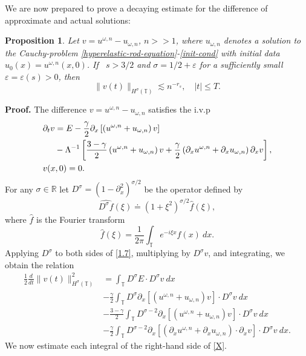 \documentclass[12pt,reqno]{amsart}
\newcommand{\rr}{\mathbb{R}}
\newcommand{\p}{\partial}
\newcommand{\ci}{\mathbb{T}}
\newcommand{\ee}{\varepsilon}
\theoremstyle{plain}  %
\newtheorem{proposition}{Proposition}
\theoremstyle{definition}
\begin{document}
%
%
%
%
%
%
%
%
%
%
We are now prepared to prove a decaying estimate for the difference of 
approximate and actual solutions:
%
%
\begin{proposition}
\label{prop:bound_for_difference-of-approx-actual-soln}
Let $v=u^{\omega,n} - u_{\omega,n}$, $n >>1$,
where $u_{\omega,n}$ denotes a solution to
the Cauchy-problem \eqref{hyperelastic-rod-equation}-\eqref{init-cond} with
initial data $u_0(x) = u^{\omega,n}(x,0)$.
If \ $s > 3/2 $ and $\sigma = 1/2 + \ee$ for a sufficiently
small $\ee = \ee(s) > 0$, then 
%
%
\begin{equation} \label{differ-Hsigma-est} \|
v(t)
\|_{H^\sigma(\ci)}
\lesssim n^{-r_s}, \quad |t| \le T.
\end{equation}
%
%
\end{proposition}
%
%
{\bf{Proof.}} The difference $v = u^{\omega,n} - u_{\omega,n}$ satisfies 
the i.v.p
\begin{align}
\label{1.7}
& \p_t v  =  E - \frac{\gamma}{2} \p_x
\left[ \left( u^{\omega,n} + u_{\omega,n} \right)v \right]
\\
\notag & \phantom{\p_t v} - \Lambda^{-1} \left[
\frac{3-\gamma}{2} \left( u^{\omega,n} + u_{\omega,n}
\right) v +
\frac{\gamma}{2}\left( \p_x u^{\omega,n} +
\p_x u_{\omega,n}
\right) \p_x v
\right], \\
& v(x,0)=0.
\end{align}
For any $\sigma \in \rr$ let   $D^\sigma=(1-\p_x^2)^{\sigma/2}$ be the  operator
defined by 
%
$$ \widehat{D^\sigma f}(\xi) \doteq (1 + \xi^2)^{\sigma/2} \widehat{f}(\xi), $$
%
where $ \widehat{f}$ is the Fourier transform
%
$$ \widehat{f}(\xi) =  \frac{1}{2\pi}\int_{\ci} e^{-i \xi x} f(x) \ dx.  $$
%
%
Applying $D^\sigma$ to both sides of \eqref{1.7}, multiplying by
$D^\sigma v$, and integrating, we obtain the
relation
%
%
\begin{equation}
\begin{split}
\frac{1}{2}\frac{d}{dt}\|v(t)\|_{H^\sigma(\ci)}^2
& = \int_{\ci} D^\sigma E \cdot D^\sigma
v \ dx
\\
&-
 \frac{\gamma}{2}\int_{\ci} D^\sigma
\p_x \left[ \left( u^{\omega,n} + u_{\omega,n} \right)v
\right]\cdot D^\sigma v \ dx
\\
& -
 \frac{3-\gamma}{2}\int_{\ci} D^{\sigma
-2} \p_x \left[ \left( u^{\omega,n} + u_{\omega,n}
\right)v \right] \cdot D^\sigma v \ dx
\\
& - \frac{\gamma}{2}\int_{\ci} D^{\sigma
-2}
\p_x \left[ \left( \p_x u^{\omega,n} + \p_x u_{\omega,n}
\right)\cdot \p_x v \right] \cdot
D^\sigma v \ dx.
\label{X}
\end{split}
\end{equation}
%
%
We now estimate each integral of the right-hand side
of \eqref{X}.
\end{document}
